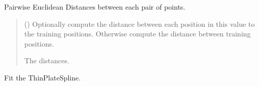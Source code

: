 \documentclass[letterpaper,10pt,english]{sphinxmanual}
\begin{document}
\begin{fulllineitems}
\begin{fulllineitems}
\end{fulllineitems}


\begin{fulllineitems}
\label{\detokenize{splines:glomar_gridding.spline.ThinPlateSpline.dist_func}}
\pysigstartsignatures
\pysiglinewithargsret
{}
{}
{}
\pysigstopsignatures
\sphinxAtStartPar
Pairwise Euclidean Distances between each pair of points.
\begin{quote}\begin{description}
\sphinxAtStartPar
{} () \textendash{} Optionally compute the distance between each position in this value
to the training positions. Otherwise compute the distance between
training positions.

\sphinxAtStartPar
{} \textendash{} The distances.

\sphinxAtStartPar
{}

\end{description}\end{quote}

\end{fulllineitems}


\begin{fulllineitems}
\label{\detokenize{splines:glomar_gridding.spline.ThinPlateSpline.fit}}
\pysigstartsignatures
\pysiglinewithargsret
{}
{\sphinxparamcomma {}\sphinxparamcomma {}\sphinxparamcomma {}}
{}
\pysigstopsignatures
\sphinxAtStartPar
Fit the ThinPlateSpline.


\end{fulllineitems}
\end{fulllineitems}
\end{document}
